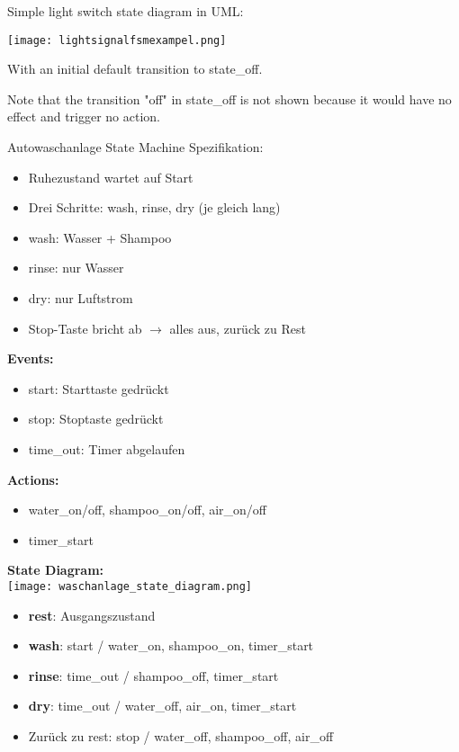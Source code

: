 \begin{example}
Simple light switch state diagram in UML:

\texttt{[image: lightsignalfsmexampel.png]}

With an initial default transition to state\_off.

Note that the transition "off" in state\_off is not shown because it would have no effect and trigger no action.
\end{example}

\begin{example2}{Autowaschanlage State Machine}
    Spezifikation:
    \begin{itemize}
        \item Ruhezustand wartet auf Start
        \item Drei Schritte: wash, rinse, dry (je gleich lang)
        \item wash: Wasser + Shampoo
        \item rinse: nur Wasser  
        \item dry: nur Luftstrom
        \item Stop-Taste bricht ab $\rightarrow$ alles aus, zurück zu Rest
    \end{itemize}
    
    \tcblower
    
    \textbf{Events:}
    \begin{itemize}
        \item start: Starttaste gedrückt
        \item stop: Stoptaste gedrückt
        \item time\_out: Timer abgelaufen
    \end{itemize}
    
    \textbf{Actions:}
    \begin{itemize}
        \item water\_on/off, shampoo\_on/off, air\_on/off
        \item timer\_start
    \end{itemize}
    
    \textbf{State Diagram:}\\
    \texttt{[image: waschanlage\_state\_diagram.png]}
    \begin{itemize}
        \item \textbf{rest}: Ausgangszustand
        \item \textbf{wash}: start / water\_on, shampoo\_on, timer\_start
        \item \textbf{rinse}: time\_out / shampoo\_off, timer\_start
        \item \textbf{dry}: time\_out / water\_off, air\_on, timer\_start
        \item Zurück zu rest: stop / water\_off, shampoo\_off, air\_off
    \end{itemize}
\end{example2}


